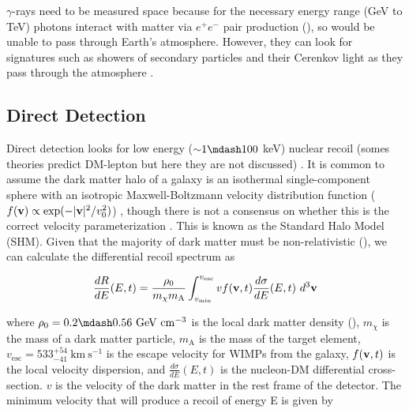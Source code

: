 $\gamma$-rays need to be measured space because for the necessary energy range (GeV to TeV) photons interact
with matter via $e^{+}e^{-}$ pair production (), so would be unable to pass through Earth's atmosphere.  However,
they can look for signatures such as showers of secondary particles and their Cerenkov
light as they pass through the atmosphere .



\subsection{Direct Detection} \label{subsec:direct}
Direct detection looks for low energy (${\sim} 1 \mdash 100$ keV) nuclear recoil (somes theories predict DM-lepton
but here they are not discussed) .  It is common to assume the dark matter halo of a galaxy is an isothermal
single-component sphere with an isotropic Maxwell-Boltzmann velocity distribution function
($f(\mathbf{v}) \propto \mathrm{exp}(-|\mathbf{v}|^2 / v_0^2)$) , though there is not a consensus on
whether this is the correct velocity parameterization
.  This is known as the Standard Halo Model (SHM).  Given that the majority of dark matter must be
non-relativistic (), we can calculate the differential recoil spectrum as 

\begin{equation} \label{eq:dr_de}
\frac{dR}{dE}(E, t) = \frac{\rho_{0}}{m_{\chi}m_{\mathrm{A}}} \int_{v_{\mathrm{min}}}^{v_{\mathrm{esc}}}
v f(\vectlett{v}, t) \frac{d\sigma}{dE}(E, t)\ d^{3}\vectlett{v}
\end{equation}

\noindent where $\rho_{0} = 0.2 \mdash 0.56\ \mathrm{GeV\ cm^{-3}}$ is the local dark matter density (),
$m_{\chi}$ is the mass of a
dark matter particle, $m_{\mathrm{A}}$ is the mass of the target element, $v_{\mathrm{esc}}= 533_{-41}^{+54}\ \mathrm{km\ s^{-1}}$
 is the escape velocity for WIMPs from the
galaxy, $f(\mathbf{v}, t)$ is the local velocity dispersion, and $\frac{d\sigma}{dE}(E, t)$ is the nucleon-DM differential
cross-section.  $v$ is the velocity of the dark matter in the rest frame of the detector.  The minimum velocity that will produce
a recoil of energy E is given by

